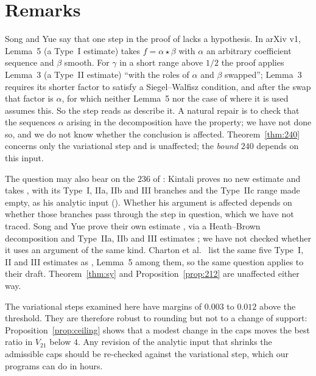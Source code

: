 \section{Remarks}

\begin{remark}\label{rem:lemma5}
Song and Yue \cite[Remark~4.23]{SY26} say that one step in the proof of
\cite[Lemma~5]{Sta26} lacks a hypothesis. In arXiv v1, Lemma~5 (a Type~I
estimate) takes $f=\alpha\star\beta$ with $\alpha$ an arbitrary
coefficient sequence and $\beta$ smooth. For $\gamma$ in a short range above
$1/2$ the proof applies Lemma~3 (a Type~II estimate) ``with the roles of
$\alpha$ and $\beta$ swapped''; Lemma~3 requires its shorter factor to satisfy
a Siegel--Walfisz condition, and after the swap that factor is $\alpha$, for
which neither Lemma~5 nor the case of \cite[Definition~9]{Sta26} where it is
used assumes this. So the step reads as \cite{SY26} describe it. A natural
repair is to check that the sequences $\alpha$ arising in the decomposition
have the property; we have not done so, and we do not know whether the
conclusion is affected. Theorem~\ref{thm:240} concerns only the variational
step and is unaffected; the \emph{bound} $240$ depends on this input.

The question may also bear on the $236$ of \cite{Kin26}: Kintali proves no
new estimate and takes \cite[Prop.~3]{Sta26}, with its Type~I, IIa, IIb and
III branches and the Type~IIc range made empty, as his analytic input
(). Whether his argument is affected depends on whether those
branches pass through the step in question, which we have not traced. Song
and Yue prove their own estimate \cite[Thm.~4.18]{SY26}, via a Heath--Brown
decomposition and Type~IIa, IIb and III estimates
\cite[\S\S4.2--4.7]{SY26}; we have not checked whether it uses an argument of
the same kind. Charton et al.\ \cite{Cha26} list the same five Type~I, II and
III estimates as \cite{Sta26}, Lemma~5 among them, so the same question
applies to their draft. Theorem~\ref{thm:sy} and
Proposition~\ref{prop:212} are unaffected either way.
\end{remark}

\begin{remark}
The variational steps examined here have margins of $0.003$ to $0.012$ above
the threshold. They are therefore robust to rounding but not to a change of
support: Proposition~\ref{prop:ceiling} shows that a modest change in the caps
moves the best ratio in $V_{21}$ below $4$. Any revision of the analytic input
that shrinks the admissible caps should be re-checked against the variational
step, which our programs can do in hours.
\end{remark}

